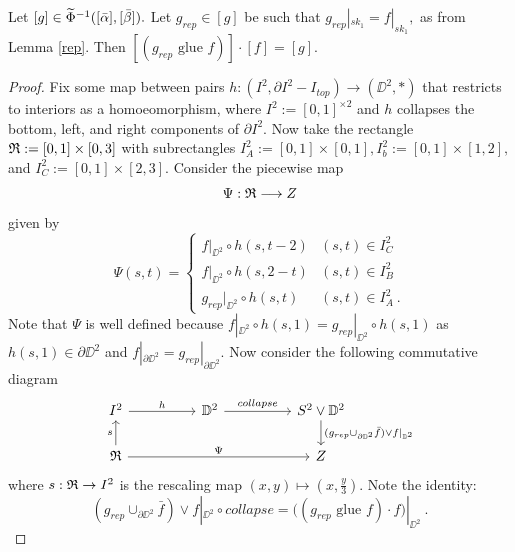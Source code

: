 \begin{lemma} \label{claim2} Let $[g] \in \widetilde{\Phi}^{-1}([\bar{\alpha}] ,[\bar{\beta}]).$ Let $g_{rep} \in [g]$ be such that $g_{rep}|_{sk_{1}} = f|_{sk_{1}},$ as from Lemma \ref{rep}.
Then $[(g_{rep} \text{ glue } f)] \cdot [f] = [g].$
\end{lemma}

\begin{proof}
Fix some map between pairs $h: (I^{2}, \partial I^{2} - I_{top}) \rightarrow (\DD^{2}, \ast)$
that restricts to interiors as a homoeomorphism, where $I^{2} := [0, 1]^{\times 2}$ and $h$ collapses the bottom, left, and right components of $\partial I^{2}.$ Now take the rectangle $\frak{R} := [0, 1] \times [0, 3]$ with subrectangles $I^{2}_{A} := [0, 1] \times [0, 1], I^{2}_{b} := [0, 1] \times [1, 2],$ and $I^{2}_{C} := [0, 1] \times [2, 3].$ Consider the piecewise map 
\[
\Psi: \frak{R} \longrightarrow Z
\]
given by \[ \Psi(s, t) =  \begin{cases} 
      f|_{\DD^{2}} \circ h(s, t - 2) & (s, t) \in I^{2}_{C} \\
      f|_{\DD^{2}} \circ h(s, 2 - t) &  (s, t) \in I^{2}_{B} \\
      g_{rep}|_{\DD^{2}} \circ h(s, t) & (s, t) \in I^{2}_{A}~.
   \end{cases}
\]
Note that $\Psi$ is well defined because $f|_{\DD^{2}} \circ h(s, 1) = g_{rep}|_{\DD^{2}} \circ h(s, 1)$ as $h(s, 1) \in \partial \DD^{2}$ and $f|_{\partial \DD^{2}} = g_{rep}|_{\partial \DD^{2}}.$ 
Now consider the following commutative diagram
\[
\begin{tikzcd}
I^{2 }\arrow[rr, "h"] 
&
&
\DD^{2} \arrow[rr, "collapse"]
&
&
S^{2} \vee \DD^{2} \arrow[d, "(g_{rep} \cup_{\partial \DD^{2}} \bar{f}) \vee f|_{\DD^{2}}"]
\\
\frak{R}  \arrow[rrrr, "\Psi"]  \arrow[u, "s"]
&
&
&
&
Z
\end{tikzcd}
\]
where $s: \frak{R} \rightarrow I^{2}$ is the rescaling map $(x, y) \mapsto (x, \frac{y}{3}).$
Note the identity: 
\[
(g_{rep} \cup_{\partial \DD^{2}} \bar{f}) \vee f|_{\DD^{2}} \circ collapse = \big((g_{rep} \text{ glue } f) \cdot f\big)|_{\DD^{2}}~.
\]



\end{proof}
